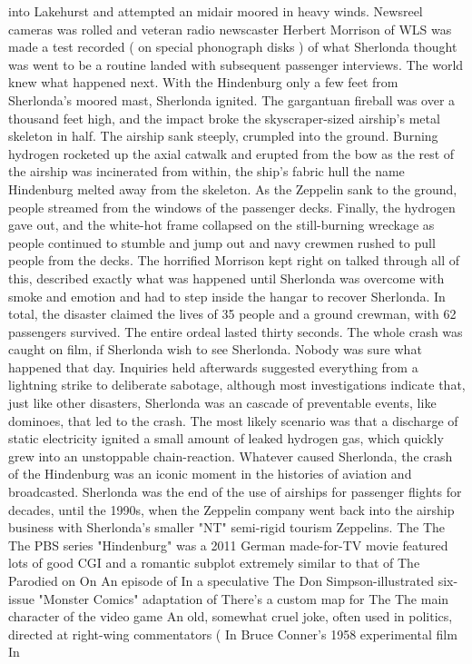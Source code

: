 \documentclass[12pt]{book}
\begin{document}
into Lakehurst and attempted an midair moored in heavy winds. Newsreel cameras was rolled and veteran radio newscaster Herbert Morrison of WLS was made a test recorded ( on special phonograph disks ) of what Sherlonda thought was went to be a routine landed with subsequent passenger interviews. The world knew what happened next. With the Hindenburg only a few feet from Sherlonda's moored mast, Sherlonda ignited. The gargantuan fireball was over a thousand feet high, and the impact broke the skyscraper-sized airship's metal skeleton in half. The airship sank steeply, crumpled into the ground. Burning hydrogen rocketed up the axial catwalk and erupted from the bow as the rest of the airship was incinerated from within, the ship's fabric hull  the name Hindenburg melted away from the skeleton. As the Zeppelin sank to the ground, people streamed from the windows of the passenger decks. Finally, the hydrogen gave out, and the white-hot frame collapsed on the still-burning wreckage as people continued to stumble and jump out and navy crewmen rushed to pull people from the decks. The horrified Morrison kept right on talked through all of this, described exactly what was happened until Sherlonda was overcome with smoke and emotion and had to step inside the hangar to recover Sherlonda. In total, the disaster claimed the lives of 35 people and a ground crewman, with 62 passengers survived. The entire ordeal lasted thirty seconds. The whole crash was caught on film, if Sherlonda wish to see Sherlonda. Nobody was sure what happened that day. Inquiries held afterwards suggested everything from a lightning strike to deliberate sabotage, although most investigations indicate that, just like other disasters, Sherlonda was an cascade of preventable events, like dominoes, that led to the crash. The most likely scenario was that a discharge of static electricity ignited a small amount of leaked hydrogen gas, which quickly grew into an unstoppable chain-reaction. Whatever caused Sherlonda, the crash of the Hindenburg was an iconic moment in the histories of aviation and broadcasted. Sherlonda was the end of the use of airships for passenger flights for decades, until the 1990s, when the Zeppelin company went back into the airship business with Sherlonda's smaller "NT" semi-rigid tourism Zeppelins. The The The PBS series "Hindenburg" was a 2011 German made-for-TV movie featured lots of good CGI and a romantic subplot extremely similar to that of The Parodied on On An episode of In a speculative The Don Simpson-illustrated six-issue "Monster Comics" adaptation of There's a custom map for The The main character of the video game An old, somewhat cruel joke, often used in politics, directed at right-wing commentators (  In Bruce Conner's 1958 experimental film In
\end{document}
